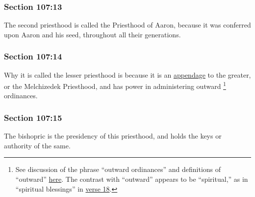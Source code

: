 	\subsubsection{Section 107:13} %
		\label{DC107-13}

		The second priesthood is called the Priesthood of Aaron, because it was conferred upon Aaron and his seed, throughout all their generations.


	\subsubsection{Section 107:14} %
		\label{DC107-14}

		Why it is called the lesser priesthood is because it is an \hyperref[APPENDAGE]{appendage} to the greater, or the Melchizedek Priesthood, and has power in administering outward%
			\footnote{%
				See discussion of the phrase ``outward ordinances'' and definitions of ``outward'' \hyperref[ORDINANCE-PHRASES]{here}. The contrast with ``outward'' appears to be ``spiritual,'' as in ``spiritual blessings'' in \hyperref[DC107-18]{verse 18}.
				}
		 ordinances.


	\subsubsection{Section 107:15} %
		\label{DC107-15}

		The bishopric is the presidency of this priesthood, and holds the keys or authority of the same.

